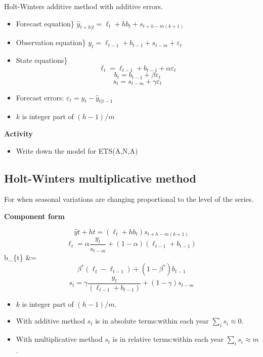\documentclass[]{book}
\providecommand{\tightlist}{%
  \setlength{\itemsep}{0pt}\setlength{\parskip}{0pt}}
\begin{document}
Holt-Winters additive method with additive errors.

\begin{itemize}
\item
  Forecast equation\} \(\hat{y}_{t+h|t} = \ell_{t} + hb_{t} + s_{t+h-m(k+1)}\)
\item
  Observation equation\} \(y_t=\ell_{t-1}+b_{t-1}+s_{t-m} + \varepsilon_t\)
\item
  State equations\} \[\ell_t=\ell_{t-1}+b_{t-1}+\alpha \varepsilon_t\]
  \[b_t=b_{t-1}+\beta \varepsilon_t\]
  \[s_t = s_{t-m} + \gamma\varepsilon_t\]
\item
  Forecast errors: \(\varepsilon_{t} = y_t - \hat{y}_{t|t-1}\)
\item
  \(k\) is integer part of \((h-1)/m\)
\end{itemize}

\textbf{Activity}

\begin{itemize}
\tightlist
\item
  Write down the model for ETS(A,N,A)
\end{itemize}

\hypertarget{holt-winters-multiplicative-method}{%
\subsection{Holt-Winters multiplicative method}\label{holt-winters-multiplicative-method}}

For when seasonal variations are changing proportional to the level of the series.

\textbf{Component form}

\[\hat{y}{t+h}{t} = (\ell_{t} + hb_{t})s_{t+h-m(k+1)}\]
\[\ell_{t} = \alpha \frac{y_{t}}{s_{t-m}} + (1 - \alpha)(\ell_{t-1} + b_{t-1})\]
b\_\{t\} \&= \[\beta^*(\ell_{t}-\ell_{t-1}) + (1 - \beta^*)b_{t-1}\]
\[s_{t} = \gamma \frac{y_{t}}{(\ell_{t-1} + b_{t-1})} + (1 - \gamma)s_{t-m}\]

\begin{itemize}
\tightlist
\item
  \(k\) is integer part of \((h-1)/m\).
\item
  With additive method \(s_t\) is in absolute terms:\newline within each year \(\sum_i s_i \approx 0\).
\item
  With multiplicative method \(s_t\) is in relative terms:\newline within each year \(\sum_i s_i \approx m\).
\end{itemize}
\end{document}
